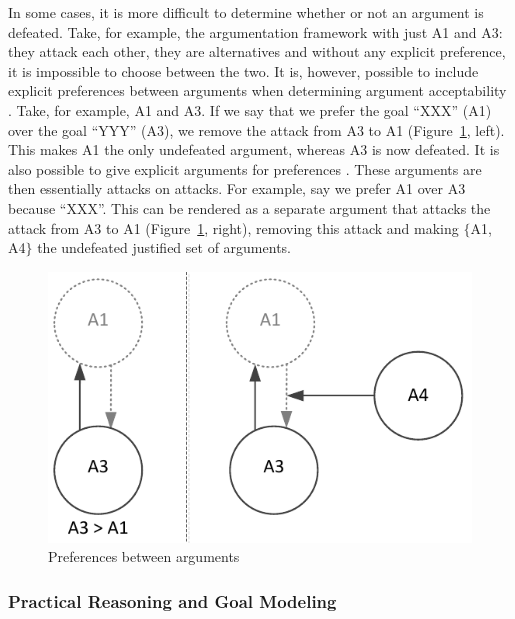 In some cases, it is more difficult to determine whether or not an argument is defeated. Take, for example, the argumentation framework with just A1 and A3: they attack each other, they are alternatives and without any explicit preference, it is impossible to choose between the two. It is, however, possible to include explicit preferences between arguments when determining argument acceptability \cite{amgoud2002reasoning}. Take, for example, A1 and A3. If we say that we prefer the goal ``XXX'' (A1) over the goal ``YYY'' (A3), we remove the attack from A3 to A1 (Figure~\ref{fig:pras:example2}, left). This makes A1 the only undefeated argument, whereas A3 is now defeated. It is also possible to give explicit arguments for preferences \cite{modgil2009}. These arguments are then essentially attacks on attacks. For example, say we prefer A1 over A3 because ``XXX''. This can be rendered as a separate argument that attacks the attack from A3 to A1 (Figure~\ref{fig:pras:example2}, right), removing this attack and making $\{$A1, A4$\}$ the undefeated justified set of arguments.

\begin{figure}[ht]
\centering
\includegraphics[width=\columnwidth]{img/Fig2}
\caption{Preferences between arguments}
\label{fig:pras:example2}
\end{figure}  

\subsubsection{Practical Reasoning and Goal Modeling}
\label{sect:background:pras:motivation}

